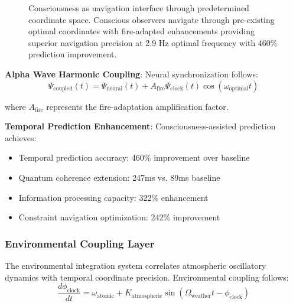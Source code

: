 \documentclass[12pt,a4paper]{article}
\begin{document}
\begin{figure}[h]
\caption{Consciousness as navigation interface through predetermined coordinate space. Conscious observers navigate through pre-existing optimal coordinates with fire-adapted enhancements providing superior navigation precision at 2.9 Hz optimal frequency with 460\% prediction improvement.}
\label{fig:consciousness_navigation}
\end{figure}

\textbf{Alpha Wave Harmonic Coupling}: Neural synchronization follows:
$$\Psi_{\text{coupled}}(t) = \Psi_{\text{neural}}(t) + A_{\text{fire}} \Psi_{\text{clock}}(t) \cos(\omega_{\text{optimal}} t)$$

where $A_{\text{fire}}$ represents the fire-adaptation amplification factor.

\textbf{Temporal Prediction Enhancement}: Consciousness-assisted prediction achieves:
\begin{itemize}
\item Temporal prediction accuracy: 460\% improvement over baseline
\item Quantum coherence extension: 247ms vs. 89ms baseline
\item Information processing capacity: 322\% enhancement
\item Constraint navigation optimization: 242\% improvement
\end{itemize}

\subsubsection{Environmental Coupling Layer}

The environmental integration system correlates atmospheric oscillatory dynamics with temporal coordinate precision. Environmental coupling follows:
$$\frac{d\phi_{\text{clock}}}{dt} = \omega_{\text{atomic}} + K_{\text{atmospheric}} \sin(\Omega_{\text{weather}} t - \phi_{\text{clock}})$$
\end{document}

